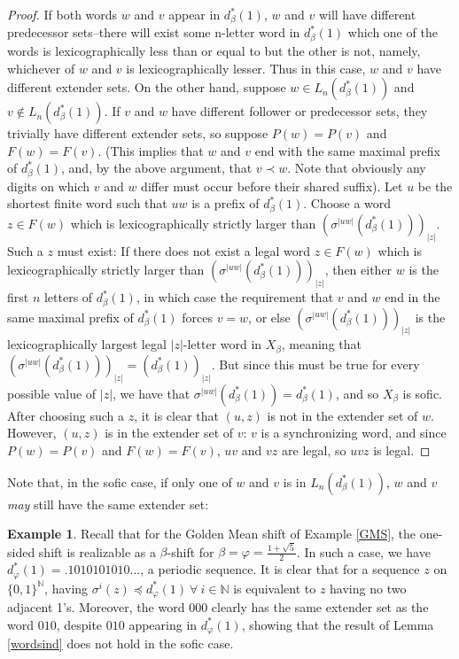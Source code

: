 \documentclass{amsart}
\theoremstyle{definition}
\newtheorem{example}[theorem]{Example}
\numberwithin{equation}{section}
\begin{document}
\begin{proof}
If both words $w$ and $v$ appear in $d_\beta^*(1)$, $w$ and $v$ will have different predecessor sets--there will exist some n-letter word in $d_\beta^*(1)$ which one of the words is lexicographically less than or equal to but the other is not, namely, whichever of $w$ and $v$ is lexicographically lesser. Thus in this case, $w$ and $v$ have different extender sets. On the other hand, suppose $w \in L_n(d_\beta^*(1))$ and $v \notin L_n(d_\beta^*(1))$. If $v$ and $w$ have different follower or predecessor sets, they trivially have different extender sets, so suppose $P(w) = P(v)$ and $F(w) = F(v)$. (This implies that $w$ and $v$ end with the same maximal prefix of $d_\beta^*(1)$, and, by the above argument, that $v \prec w$. Note that obviously any digits on which $v$ and $w$ differ must occur before their shared suffix). Let $u$ be the shortest finite word such that $uw$ is a prefix of $d_\beta^*(1)$. \newline
\indent Choose a word $z \in F(w)$ which is lexicographically strictly larger than $(\sigma^{|uw|}(d_\beta^*(1)))_{|z|}$. Such a $z$ must exist: If there does not exist a legal word $z \in F(w)$ which is lexicographically strictly larger than $(\sigma^{|uw|}(d_\beta^*(1)))_{|z|}$, then either $w$ is the first $n$ letters of $d_\beta^*(1)$, in which case the requirement that $v$ and $w$ end in the same maximal prefix of $d_\beta^*(1)$ forces $v = w$, or else $(\sigma^{|uw|}(d_\beta^*(1)))_{|z|}$ is the lexicographically largest legal $|z|$-letter word in $X_\beta$, meaning that $(\sigma^{|uw|}(d_\beta^*(1)))_{|z|} = (d_\beta^*(1))_{|z|}$. But since this must be true for every possible value of $|z|$, we have that $\sigma^{|uw|}(d_\beta^*(1)) = d_\beta^*(1)$, and so $X_\beta$ is sofic. \newline
\indent After choosing such a $z$, it is clear that $(u,z)$ is not in the extender set of $w$. However, $(u,z)$ is in the extender set of $v$: $v$ is a synchronizing word, and since $P(w) = P(v)$ and $F(w) = F(v)$, $uv$ and $vz$ are legal, so $uvz$ is legal. 
\end{proof}

Note that, in the sofic case, if only one of $w$ and $v$ is in $L_n(d_\beta^*(1))$, $w$ and $v$ \textit{may} still have the same extender set:

\begin{example}\label{GMS2}
Recall that for the Golden Mean shift of Example \ref{GMS}, the one-sided shift is realizable as a $\beta$-shift for $\beta = \varphi = \frac{1+ \sqrt{5}}{2}$. In such a case, we have $d_\varphi^*(1) = .1010101010...$, a periodic sequence. It is clear that for a sequence $z$ on $\{0,1\}^{\mathbb{N}}$, having $\sigma^i(z) \preceq d_\varphi^*(1) \> \forall \> i \in \mathbb{N}$ is equivalent to $z$ having no two adjacent 1's. Moreover, the word $000$ clearly has the same extender set as the word $010$, despite $010$ appearing in $d_\varphi^*(1)$, showing that the result of Lemma \ref{wordsind} does not hold in the sofic case.
\end{example}
\end{document}
